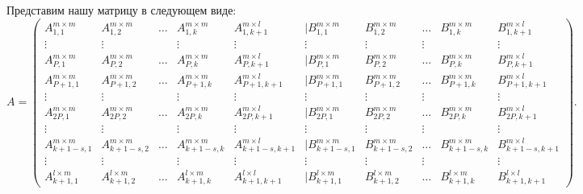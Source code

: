 \documentclass[a4paper,12pt]{article}
\begin{document}
Представим нашу матрицу в следующем виде:
\begin{equation*}
A = 
\begin{pmatrix}
A_{1,1}^{m \times m} & A_{1,2}^{m \times m} & \dots & A_{1,k}^{m \times m} & A_{1,k+1}^{m \times l} & | B_{1,1}^{m \times m} & B_{1,2}^{m \times m} & \dots & B_{1,k}^{m\times m} & B_{1,k+1}^{m \times l}\\
\vdots & \vdots &  & \vdots & \vdots &\vdots  &\vdots   &\vdots  & \  &\vdots \\
A_{P,1}^{m \times m} & A_{P,2}^{m \times m} & \dots & A_{P,k}^{m \times m} & A_{P,k+1}^{m \times l}& | B_{P,1}^{m \times m} & B_{P,2}^{m \times m} & \dots & B_{P,k}^{m\times m} & B_{P,k+1}^{m \times l}\\
\hline
A_{P+1,1}^{m \times m} & A_{P+1,2}^{m \times m} & \dots & A_{P+1,k}^{m \times m} & A_{P+1,k+1}^{m \times l} & | B_{P+1,1}^{m \times m} & B_{P+1,2}^{m \times m} & \dots & B_{P+1,k}^{m\times m} & B_{P+1,k+1}^{m \times l}\\
\vdots & \vdots &  & \vdots & \vdots &\vdots  &\vdots   &\vdots  & \  &\vdots \\A_{2P,1}^{m \times m} & A_{2P,2}^{m \times m} & \dots & A_{2P,k}^{m \times m} & A_{2P,k+1}^{m \times l} & | B_{2P,1}^{m \times m} & B_{2P,2}^{m \times m} & \dots & B_{2P,k}^{m\times m} & B_{2P,k+1}^{m \times l}\\
\hline
\vdots & \vdots &  & \vdots & \vdots &\vdots  &\vdots   &\vdots  & \  &\vdots \\\hline
A_{k+1-s,1}^{m \times m} & A_{k+1-s,2}^{m \times m} & \dots & A_{k+1-s,k}^{m \times m} & A_{k+1-s,k+1}^{m \times l} & | B_{k+1-s,1}^{m \times m} & B_{k+1-s,2}^{m \times m} & \dots & B_{k+1-s,k}^{m\times m} & B_{k+1-s,k+1}^{m \times l}\\
\vdots & \vdots &  & \vdots & \vdots &\vdots  &\vdots   &\vdots  & \  &\vdots \\
A_{k+1,1}^{l \times m} & A_{k+1,2}^{l \times m} & \dots & A_{k+1,k}^{l \times m} & A_{k+1,k+1}^{l \times l} & | B_{k+1,1}^{l \times m} & B_{k+1,2}^{l \times m} & \dots & B_{k+1,k}^{l\times m} & B_{k+1,k+1}^{l \times l}
\end{pmatrix}.
\end{equation*}
\end{document}
